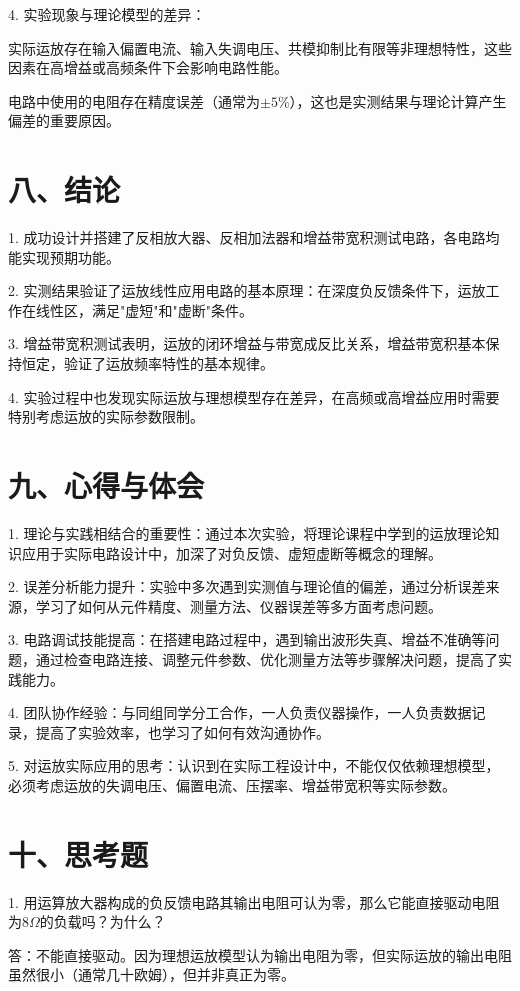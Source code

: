\documentclass[12pt,a4paper]{article}
\begin{document}
4. 实验现象与理论模型的差异：

   实际运放存在输入偏置电流、输入失调电压、共模抑制比有限等非理想特性，这些因素在高增益或高频条件下会影响电路性能。

   电路中使用的电阻存在精度误差（通常为$\pm5\%$），这也是实测结果与理论计算产生偏差的重要原因。

\section*{八、结论}

1. 成功设计并搭建了反相放大器、反相加法器和增益带宽积测试电路，各电路均能实现预期功能。

2. 实测结果验证了运放线性应用电路的基本原理：在深度负反馈条件下，运放工作在线性区，满足"虚短"和"虚断"条件。

3. 增益带宽积测试表明，运放的闭环增益与带宽成反比关系，增益带宽积基本保持恒定，验证了运放频率特性的基本规律。

4. 实验过程中也发现实际运放与理想模型存在差异，在高频或高增益应用时需要特别考虑运放的实际参数限制。
\section*{九、心得与体会}

1. 理论与实践相结合的重要性：通过本次实验，将理论课程中学到的运放理论知识应用于实际电路设计中，加深了对负反馈、虚短虚断等概念的理解。

2. 误差分析能力提升：实验中多次遇到实测值与理论值的偏差，通过分析误差来源，学习了如何从元件精度、测量方法、仪器误差等多方面考虑问题。

3. 电路调试技能提高：在搭建电路过程中，遇到输出波形失真、增益不准确等问题，通过检查电路连接、调整元件参数、优化测量方法等步骤解决问题，提高了实践能力。

4. 团队协作经验：与同组同学分工合作，一人负责仪器操作，一人负责数据记录，提高了实验效率，也学习了如何有效沟通协作。

5. 对运放实际应用的思考：认识到在实际工程设计中，不能仅仅依赖理想模型，必须考虑运放的失调电压、偏置电流、压摆率、增益带宽积等实际参数。
\section*{十、思考题}
1. 用运算放大器构成的负反馈电路其输出电阻可认为零，那么它能直接驱动电阻为$8 \Omega$的负载吗？为什么？

答：不能直接驱动。因为理想运放模型认为输出电阻为零，但实际运放的输出电阻虽然很小（通常几十欧姆），但并非真正为零。
\end{document}
